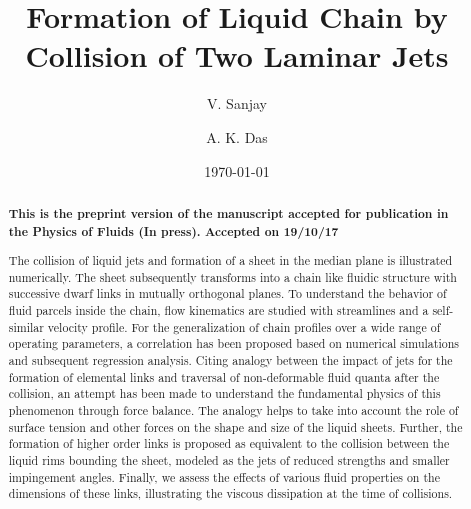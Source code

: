 \documentclass[%
 aip,
 sd,%
amsmath,amssymb,
preprint,%
author-year,%
]{revtex4-1}
\begin{document}
\newcommand{\MarkerCircleRed}{\raisebox{0.5pt}{\tikz{\node[draw,scale=0.4,circle,fill=red!100!red](){};}}}
\newcommand{\MarkerSquareRed}{\raisebox{0.5pt}{\tikz{\node[draw,scale=0.4,regular polygon, regular polygon sides=4,fill=black!20!red](){};}}}
\newcommand{\MarkerDiamondBlack}{\raisebox{0pt}{\tikz{\node[draw,scale=0.4,diamond,fill=black!100!](){};}}}
\newcommand{\MarkerSquareEmpty}{\raisebox{0pt}{\tikz{\node[draw,scale=0.4,regular polygon, regular polygon sides=4](){};}}}
\newcommand{\MarkerCircleEmpty}{\raisebox{0pt}{\tikz{\node[draw,scale=0.4,circle](){};}}}
\title[]{Formation of Liquid Chain by Collision of Two Laminar Jets}
\author{V. Sanjay}
\author{A. K. Das}
%
\date{\today}

\begin{abstract}
\begin{center}
\textbf{This is the preprint version of the manuscript accepted for publication in the Physics of Fluids (In press). Accepted on 19/10/17} \\
\end{center}
The collision of liquid jets and formation of a sheet in the median plane is illustrated numerically. The sheet subsequently transforms into a chain like fluidic structure with successive dwarf links in mutually orthogonal planes. To understand the behavior of fluid parcels inside the chain, flow kinematics are studied with streamlines and a self-similar velocity profile. For the generalization of chain profiles over a wide range of operating parameters, a correlation has been proposed based on numerical simulations and subsequent regression analysis. Citing analogy between the impact of jets for the formation of elemental links and traversal of non-deformable fluid quanta after the collision, an attempt has been made to understand the fundamental physics of this phenomenon through force balance. The analogy helps to take into account the role of surface tension and other forces on the shape and size of the liquid sheets. Further, the formation of higher order links is proposed as equivalent to the collision between the liquid rims bounding the sheet, modeled as the jets of reduced strengths and smaller impingement angles. Finally, we assess the effects of various fluid properties on the dimensions of these links, illustrating the viscous dissipation at the time of collisions.  
\end{abstract}
\maketitle
\end{document}
